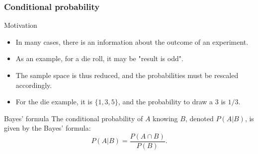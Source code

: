 \begin{frame}
    \frametitle{Conditional probability}
    \begin{block}{Motivation}
    \begin{itemize}
        \item<+-> In many cases, there is an information about the outcome of
        an experiment.
        \item<+-> As an example, for a die roll, it may be "result is odd".
        \item<+-> The sample space is thus reduced, and the probabilities must 
        be rescaled accordingly.
        \item<+-> For the die example, it is $\{1,3,5\}$, and the probability 
        to draw a $3$ is $1/3.$
    \end{itemize}
    \end{block}
    \begin{block}{Bayes' formula}
        The conditional probability of $A$ knowing $B$, denoted $P\left( A \vert B \right)$, is given by the Bayes' formula:
        \begin{equation}
            P\left( A \vert B  \right) = \frac{P\left( A \cap B \right)}{P(B)}.
        \end{equation}
    \end{block}
\end{frame}

